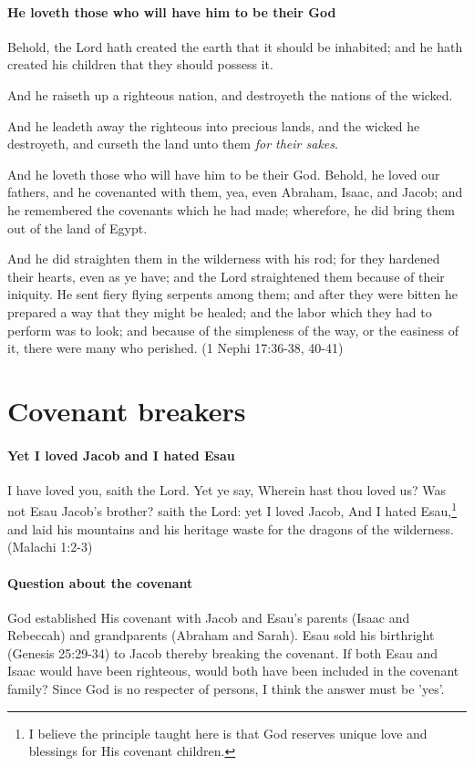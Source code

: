 \paragraph{He loveth those who will have him to be their God}
Behold, the Lord hath created the earth that it should be inhabited; and he hath created his children that they should possess it.

And he raiseth up a righteous nation, and destroyeth the nations of the wicked.

And he leadeth away the righteous into precious lands, and the wicked he destroyeth, and curseth the land unto them \textit{for their sakes}.

And he loveth those who will have him to be their God. Behold, he loved our fathers, and he covenanted with them, yea, even Abraham, Isaac, and Jacob; and he remembered the covenants which he had made; wherefore, he did bring them out of the land of Egypt.

And he did straighten them in the wilderness with his rod; for they hardened their hearts, even as ye have; and the Lord straightened them because of their iniquity. He sent fiery flying serpents among them; and after they were bitten he prepared a way that they might be healed; and the labor which they had to perform was to look; and because of the simpleness of the way, or the easiness of it, there were many who perished. (1 Nephi 17:36-38, 40-41)

\section{Covenant breakers}

\paragraph{Yet I loved Jacob and I hated Esau}
I have loved you, saith the Lord. Yet ye say, Wherein hast thou loved us? Was not Esau Jacob's brother? saith the Lord: yet I loved Jacob, And I hated Esau,\footnote{I believe the principle taught here is that God reserves unique love and blessings for His covenant children.} and laid his mountains and his heritage waste for the dragons of the wilderness. (Malachi 1:2-3)

\paragraph{Question about the covenant}
God established His covenant with Jacob and Esau's parents (Isaac and Rebeccah) and grandparents (Abraham and Sarah). Esau sold his birthright (Genesis 25:29-34) to Jacob thereby breaking the covenant. If both Esau and Isaac would have been righteous, would both have been included in the covenant family? Since God is no respecter of persons, I think the answer must be 'yes'.

